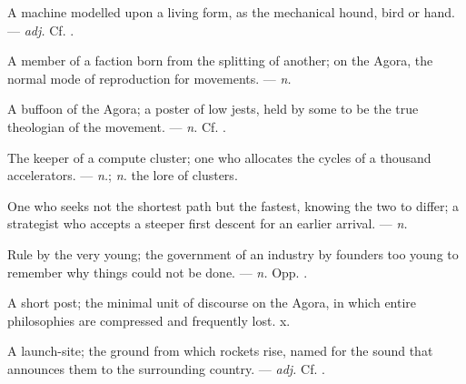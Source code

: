  A machine modelled upon a living form, as the mechanical hound, bird or hand. ---  \textit{adj.} Cf. .

 A member of a faction born from the splitting of another; on the Agora, the normal mode of reproduction for movements.   ---  \textit{n.}

 A buffoon of the Agora; a poster of low jests, held by some to be the true theologian of the movement.  ---  \textit{n.} Cf. .

 The keeper of a compute cluster; one who allocates the cycles of a thousand accelerators.   ---  \textit{n.};  \textit{n.} the lore of clusters.

 One who seeks not the shortest path but the fastest, knowing the two to differ; a strategist who accepts a steeper first descent for an earlier arrival. ---  \textit{n.}

  Rule by the very young; the government of an industry by founders too young to remember why things could not be done.  ---  \textit{n.} Opp. .

 A short post; the minimal unit of discourse on the Agora, in which entire philosophies are compressed and frequently lost.   x.

 A launch-site; the ground from which rockets rise, named for the sound that announces them to the surrounding country. ---  \textit{adj.} Cf. .


